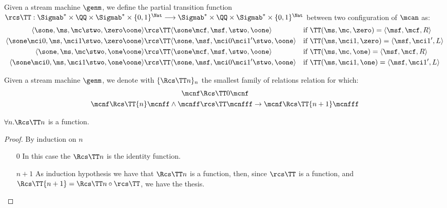 \begin{defn}
Given a stream machine $\genm$, we define the partial transition function $\rcs\TT: \Sigmab^* \times \QQ \times \Sigmab^* \times \{0,1\}^\Nat\longrightarrow \Sigmab^* \times \QQ \times \Sigmab^* \times \{0,1\}^\Nat$ between two configuration of $\mcan$ as:
\begin{align*}
\langle \sone, \ms, \mc \stwo, \zero\oone\rangle &\rcs\TT \langle \sone\mcf, \msf, \stwo, \oone\rangle && \text{if }\TT(\ms, \mc, \zero) =  \langle \msf, \mcf, R \rangle\\
\langle \sone \mci 0, \ms,\mci 1 \stwo, \zero\oone\rangle &\rcs\TT \langle \sone, \msf,\mci0\mci1' \stwo, \oone\rangle && \text{if }\TT( \ms, \mci 1, \zero) =\langle \msf, \mci 1', L \rangle\\
\langle \sone, \ms, \mc \stwo, \one\oone\rangle &\rcs\TT \langle \sone\mcf, \msf, \stwo, \oone\rangle&& \text{if }  \TT(\ms, \mc, \one) = \langle \msf, \mcf, R\rangle \\
\langle \sone \mci 0, \ms,\mci 1 \stwo, \one\oone\rangle &\rcs\TT \langle \sone, \msf,\mci0\mci1' \stwo, \oone\rangle && \text{if }\TT(\ms, \mci 1, \one)=\langle \msf, \mci 1', L \rangle  \\
\end{align*}
\end{defn}


\begin{defn}
Given a stream machine $\genm$, we denote with $\{\Rcs\TT n\}_n$ the smallest family of relations relation for which:
\begin{align*}
\mcnf&\Rcs\TT 0 \mcnf\\
\mcnf\Rcs\TT {n} \mcnff \land \mcnff &\rcs\TT \mcnfff \to \mcnf\Rcs\TT {n+1} \mcnfff
\end{align*}
\end{defn}

\begin{lemma}
$\forall n. \Rcs\TT n$ is a function.
\end{lemma}

\begin{proof}
By induction on $n$
\begin{itemize}
\item[0] In this case the $\Rcs\TT n$ is the identity function.
\item[$n+1$] As induction hypothesis we have that $\Rcs\TT n$ is a function, then, since $\rcs\TT$ is a function, and $\Rcs\TT {n+1} = \Rcs\TT n\circ \rcs \TT $, we have the thesis.
\end{itemize}
\end{proof}

